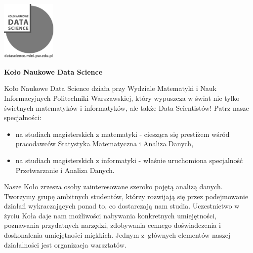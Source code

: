 \documentclass[\main/boa.tex]{subfiles}
\begin{document}
	\begin{minipage}[t]{0.915\textwidth}
		\center     
		\includegraphics[width=100px]{img/logos.bw/knds_logo.png} 
	\end{minipage}

\Large \textbf {Koło Naukowe Data Science}


\vskip 0.3cm
\normalsize 
Koło Naukowe Data Science działa przy Wydziale Matematyki i Nauk Informacyjnych Politechniki Warszawskiej, który wypuszcza w świat nie tylko świetnych matematyków i informatyków, ale także Data Scientistów! Patrz nasze specjalności:

\begin{itemize}
\item na studiach magisterskich z matematyki - ciesząca się prestiżem wśród pracodawców Statystyka Matematyczna i Analiza Danych,
\item na studiach magisterskich z informatyki - właśnie uruchomiona specjalność \\ Przetwarzanie i Analiza Danych.
\end{itemize}

Nasze Koło zrzesza osoby zainteresowane szeroko pojętą analizą danych. Tworzymy grupę ambitnych studentów, którzy rozwijają się przez podejmowanie działań wykraczających ponad to, co dostarczają nam studia. Uczestnictwo w życiu Koła daje nam możliwości nabywania konkretnych umiejętności, poznawania przydatnych narzędzi, zdobywania cennego doświadczenia i doskonalenia umiejętności miękkich. Jednym z~głównych elementów naszej działalności jest organizacja warsztatów. 
\end{document}
